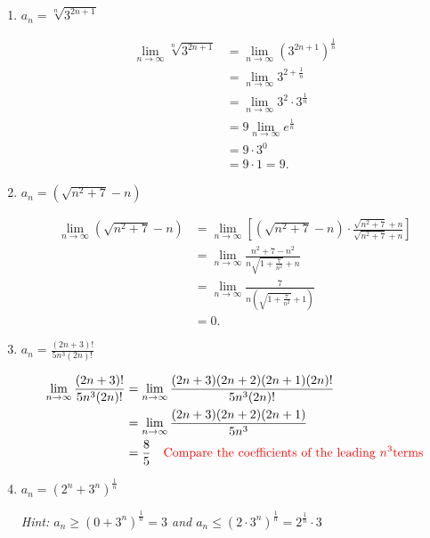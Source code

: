 \documentclass[handout]{ximera}
\begin{document}
\begin{problem}
\begin{enumerate}
	
	
	\item  $a_n = \sqrt[n]{3^{2n+1}}$
	\begin{freeResponse}
		\begin{align*}
		\lim_{n \to \infty} \sqrt[n]{3^{2n+1}}
		&= \lim_{n \to \infty} \left( 3^{2n+1} \right)^{\frac{1}{n}}  \\
		&= \lim_{n \to \infty} 3^{2 + \frac{1}{n}}  \\
		&= \lim_{n \to \infty} 3^2 \cdot 3^{\frac{1}{n}}  \\
		&= 9 \lim_{n \to \infty} e^{\frac{1}{n}}  \\
		&= 9 \cdot 3^0  \\
		&= 9 \cdot 1 = 9.
		\end{align*}
	\end{freeResponse}
	
	
	
	\item  $a_n = \left( \sqrt{n^2+7} - n \right)$
	\begin{freeResponse}
		\begin{align*}
		\lim_{n \to \infty} \left( \sqrt{n^2+7} - n \right)
		&= \lim_{n \to \infty} \left[ \left( \sqrt{n^2 + 7} - n \right) \cdot \frac{\sqrt{n^2 + 7} + n}{\sqrt{n^2 + 7} + n} \right]  \\
		&= \lim_{n \to \infty} \frac{n^2 + 7 - n^2}{n \sqrt{1 + \frac{7}{n^2}} + n}  \\
		&= \lim_{n \to \infty} \frac{7}{n ( \sqrt{1 + \frac{7}{n^2}} + 1)}  \\
		&= 0.
		\end{align*}
	\end{freeResponse}
	
	
	
	\item  $a_n = \frac{(2n+3)!}{5n^3 (2n)!}$
	\begin{freeResponse}
		\begin{align*}
		\lim_{n \to \infty} \frac{(2n+3)!}{5n^3(2n)!}
		&= \lim_{n \to \infty} \frac{(2n+3)(2n+2)(2n+1)(2n)!}{5n^3(2n)!}  \\
		&= \lim_{n \to \infty} \frac{(2n+3)(2n+2)(2n+1)}{5n^3}  \\
		&= \frac{8}{5} 	\quad	{\color{red}\text{Compare the coefficients of the leading }n^3 \text{terms}}
		\end{align*}
	\end{freeResponse}
	
	

	\item  $a_n = (2^n + 3^n)^{\frac{1}{n}}$  
	\begin{center}
	{\it Hint:  $a_n \geq (0+3^n)^{\frac{1}{n}} = 3$ and $a_n \leq (2 \cdot 3^n)^{\frac{1}{n}} = 2^{\frac{1}{n}} \cdot 3$}
	\end{center}


\end{enumerate}
\end{problem}
\end{document}

